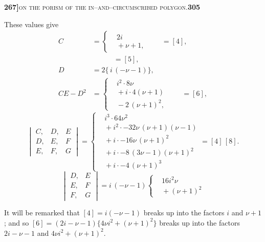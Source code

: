 \documentclass[11pt]{article}
\begin{document}
\newpage
\setcounter{page}{305}

\noindent\textbf{267]}\hfill\textsc{on the porism of the in--and--circumscribed polygon.}\hfill\textbf{305}

\medskip

\noindent These values give
\[
\begin{aligned}
   C &= \left\{\begin{aligned}&2 i\\ &{}+\nu + 1,\end{aligned}\right.\hspace{2em}= [4],\\[4pt]
   &\quad\hspace{2em}= [5],\\[2pt]
   D &= 2\bigl\{\,i\,(-\nu - 1)\bigr\},\\[4pt]
   CE - D^2 &= \left\{\begin{aligned}&i^2\cdot 8\nu\\ &{}+ i\cdot 4(\nu+1)\\ &{}- 2\,(\nu + 1)^2,\end{aligned}\right.\hspace{2em}= [6],
\end{aligned}
\]
\[
\begin{vmatrix} C, & D, & E\\ D, & E, & F\\ E, & F, & G\end{vmatrix} = \left\{\begin{aligned}&i^3\cdot 64\nu^2\\ &{}+ i^2\cdot -32\nu\,(\nu+1)(\nu-1)\\ &{}+ i\cdot -16\nu\,(\nu+1)^2\\ &{}+ i\cdot -8\,(3\nu - 1)(\nu+1)^2\\ &{}+ i\cdot -4\,(\nu+1)^3\end{aligned}\right.= [4]\,[8].
\]
\[
\begin{vmatrix} D, & E\\ E, & F\\ F, & G\end{vmatrix} = i\,(-\nu - 1)\left\{\begin{aligned}&16 i^2 \nu\\ &{}+ (\nu+1)^2\end{aligned}\right.
\]

\medskip

\noindent It will be remarked that $[4] = i(-\nu - 1)$ breaks up into the factors $i$ and $\nu + 1$; and so $[6] = (2 i - \nu - 1)\{4\nu i^2 + (\nu+1)^2\}$ breaks up into the factors $2 i - \nu - 1$ and $4\nu i^2 + (\nu+1)^2$.
\end{document}
